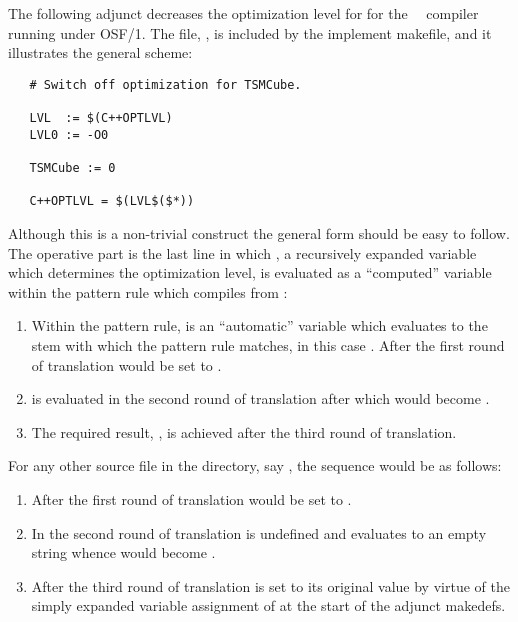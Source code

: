 The following adjunct  decreases the optimization level for
 for the \gnu\ \cplusplus\ compiler running under
\textsc{OSF/1}.  The file,
, is included by the
implement makefile, and it illustrates the general scheme:

\begin{verbatim}
   # Switch off optimization for TSMCube.
 
   LVL  := $(C++OPTLVL)
   LVL0 := -O0
 
   TSMCube := 0
 
   C++OPTLVL = $(LVL$($*))
\end{verbatim}

\noindent
Although this is a non-trivial construct the general form should be easy to
follow.  The operative part is the last line in which , a
recursively expanded  variable which determines the \cplusplus
optimization level, is evaluated as a ``computed'' variable within the pattern
rule which compiles  from :

\begin{enumerate}
   \item Within the pattern rule, \code{\$*} is an ``automatic'' variable
         which evaluates to the stem with which the pattern rule matches, in
         this case .  After the first round of translation
          would be set to .

   \item {} is evaluated in the second round of translation
         after which  would become .

   \item The required result, , is achieved after the
         third round of translation.
\end{enumerate}

\noindent
For any other source file in the 
directory, say , the sequence would be as follows:
 
\begin{enumerate}
   \item After the first round of translation  would be set to
         .
 
   \item In the second round of translation  is undefined and
         evaluates to an empty string whence  would become
         .
 
   \item After the third round of translation  is set to its
         original value by virtue of the simply expanded variable assignment
         of  at the start of the adjunct makedefs.
\end{enumerate}

